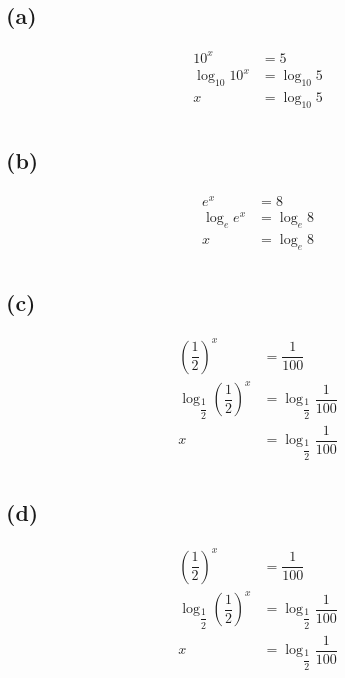 \documentclass{article}
\begin{document}
\subsection*{(a)}
\begin{equation}
\begin{split}
	10^x & = 5\\
	\log_{10}10^x & = \log_{10}5\\
	 x & = \log_{10}5\\
\end{split}
\end{equation}

\subsection*{(b)}
\begin{equation}
\begin{split}
	e^x & = 8\\
	\log_{e}e^x & = \log_{e}8\\
	 x & = \log_{e}8\\
\end{split}
\end{equation}

\subsection*{(c)}
\begin{equation}
\begin{split}
	(\dfrac{1}{2})^x & = \dfrac{1}{100} \\
	\log_{\dfrac{1}{2}}(\dfrac{1}{2})^x & = \log_{\dfrac{1}{2}}\dfrac{1}{100} \\
	 x & = \log_{\dfrac{1}{2}}\dfrac{1}{100} \\
\end{split}
\end{equation}

\subsection*{(d)}
\begin{equation}
\begin{split}
    (\dfrac{1}{2})^x & = \dfrac{1}{100} \\
    \log_{\dfrac{1}{2}}(\dfrac{1}{2})^x & = \log_{\dfrac{1}{2}}\dfrac{1}{100} \\
     x & = \log_{\dfrac{1}{2}}\dfrac{1}{100} \\
\end{split}
\end{equation}
\end{document}
